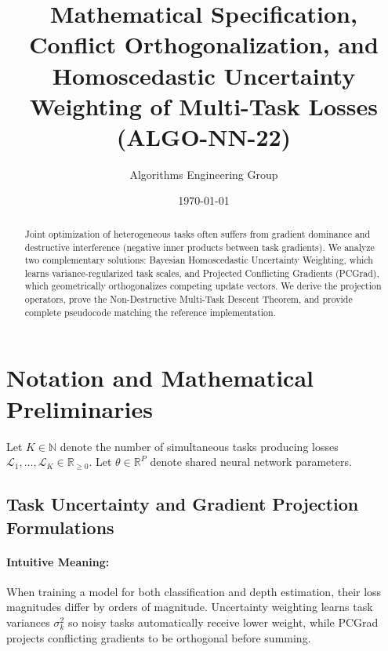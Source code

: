 \documentclass[11pt]{article}
\title{\textbf{Mathematical Specification, Conflict Orthogonalization, and Homoscedastic Uncertainty Weighting of Multi-Task Losses (ALGO-NN-22)}}
\author{Algorithms Engineering Group}
\date{\today}
\begin{document}
\maketitle

\begin{abstract}
Joint optimization of heterogeneous tasks often suffers from gradient dominance and destructive interference (negative inner products between task gradients). We analyze two complementary solutions: Bayesian Homoscedastic Uncertainty Weighting, which learns variance-regularized task scales, and Projected Conflicting Gradients (PCGrad), which geometrically orthogonalizes competing update vectors. We derive the projection operators, prove the Non-Destructive Multi-Task Descent Theorem, and provide complete pseudocode matching the reference implementation.
\end{abstract}

\section{Notation and Mathematical Preliminaries}
\label{sec:notation}

Let $K \in \mathbb{N}$ denote the number of simultaneous tasks producing losses $\mathcal{L}_1, \dots, \mathcal{L}_K \in \mathbb{R}_{\ge 0}$. Let $\theta \in \mathbb{R}^P$ denote shared neural network parameters.

\subsection{Task Uncertainty and Gradient Projection Formulations}
\paragraph{Intuitive Meaning:} When training a model for both classification and depth estimation, their loss magnitudes differ by orders of magnitude. Uncertainty weighting learns task variances $\sigma_k^2$ so noisy tasks automatically receive lower weight, while PCGrad projects conflicting gradients to be orthogonal before summing.
\end{document}
